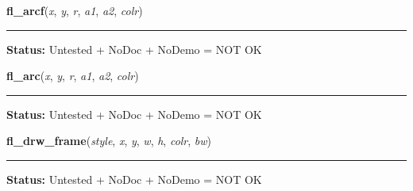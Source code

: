     \label{xformslib:library:fl_arcf}

    \vspace{0.5ex}

\hspace{.8\funcindent}\begin{boxedminipage}{\funcwidth}

    \raggedright \textbf{fl\_arcf}(\textit{x}, \textit{y}, \textit{r}, \textit{a1}, \textit{a2}, \textit{colr})

    \vspace{-1.5ex}

    \rule{\textwidth}{0.5\fboxrule}
\setlength{\parskip}{2ex}
\setlength{\parskip}{1ex}
\textbf{Status:} Untested + NoDoc + NoDemo = NOT OK



    \end{boxedminipage}

    \label{xformslib:library:fl_arc}

    \vspace{0.5ex}

\hspace{.8\funcindent}\begin{boxedminipage}{\funcwidth}

    \raggedright \textbf{fl\_arc}(\textit{x}, \textit{y}, \textit{r}, \textit{a1}, \textit{a2}, \textit{colr})

    \vspace{-1.5ex}

    \rule{\textwidth}{0.5\fboxrule}
\setlength{\parskip}{2ex}
\setlength{\parskip}{1ex}
\textbf{Status:} Untested + NoDoc + NoDemo = NOT OK



    \end{boxedminipage}

    \label{xformslib:library:fl_drw_frame}

    \vspace{0.5ex}

\hspace{.8\funcindent}\begin{boxedminipage}{\funcwidth}

    \raggedright \textbf{fl\_drw\_frame}(\textit{style}, \textit{x}, \textit{y}, \textit{w}, \textit{h}, \textit{colr}, \textit{bw})

    \vspace{-1.5ex}

    \rule{\textwidth}{0.5\fboxrule}
\setlength{\parskip}{2ex}
\setlength{\parskip}{1ex}
\textbf{Status:} Untested + NoDoc + NoDemo = NOT OK



    \end{boxedminipage}

